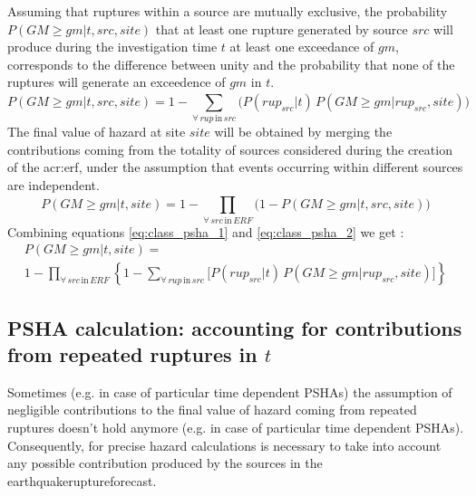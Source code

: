 Assuming that ruptures within a source are mutually exclusive, 
the probability $P(GM\geq gm|t,src,site)$ that at least one rupture 
generated by source $src$ will produce during the investigation 
time $t$ at least one exceedance of $gm$, corresponds to the 
difference between unity and the probability that none of the 
ruptures will generate an exceedence of $gm$ in $t$.
\begin{equation}
P(GM\geq gm|t,src,site) = 1 - \sum_{\forall\,rup\,\text{in}\,src}^{} 
	\Big( P(rup_{src}|t)\,
	P(GM\geq gm|rup_{src},site) \Big)
\label{eq:class_psha_1}
\end{equation}
The final value of hazard at site $site$ will be obtained by 
merging the contributions coming from the totality of sources 
considered during the creation of the \gls{acr:erf}, under the 
assumption that events occurring within different sources are 
independent.
%
\begin{equation}
P(GM \geq gm|t,site) = 1 - \prod_{\forall\,src\,\text{in}\,ERF}^{} 
\Big( 1-P(GM\geq gm|t,src,site) \Big) \label{eq:class_psha_2}
\end{equation}
%
Combining equations \ref{eq:class_psha_1} and \ref{eq:class_psha_2} 
we get \cite[see also][equation 4, page 410]{field2003}:
%
\begin{multline}
P(GM \geq gm|t,site) = \\
	1-\prod\limits_{\forall\,src\,\text{in}\,ERF}^{}  
	\left\{
		1-\sum\limits_{\forall\,rup\,\text{in}\,src}^{} 
			\biggl[ P(rup_{src}|t)\,P(GM\geq gm|rup_{src},site)
			\biggr]
	\right\}
\label{eq:PSHA_calc_classical_no_repeating}
\end{multline}
%
\subsection{PSHA calculation: accounting for contributions from 
repeated ruptures in $t$}
%
Sometimes  (e.g. in case of particular time dependent PSHAs) the 
assumption of negligible contributions to the final value 
of hazard coming from repeated ruptures doesn't hold anymore (e.g. in 
case of particular time dependent PSHAs). 
%
Consequently, for precise hazard calculations is necessary to take 
into account any possible contribution produced by the sources in the
\gls{earthquakeruptureforecast}.

